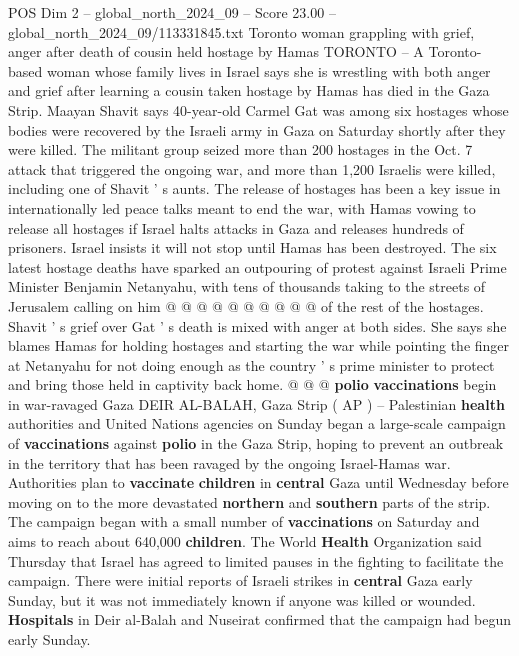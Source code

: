 \begin{textsample}{POS Dim 2 – global\_north\_2024\_09 – Score 23.00 – global\_north\_2024\_09/113331845.txt}  \label{ex:f2_pos_415}
Toronto woman grappling with grief, anger after death of cousin held hostage by Hamas TORONTO -- A Toronto-based woman whose family lives in Israel says she is wrestling with both anger and grief after learning a cousin taken hostage by Hamas has died in the Gaza Strip.
Maayan Shavit says 40-year-old Carmel Gat was among six hostages whose bodies were recovered by the Israeli army in Gaza on Saturday shortly after they were killed.
The militant group seized more than 200 hostages in the Oct. 7 attack that triggered the ongoing war, and more than 1,200 Israelis were killed, including one of Shavit ' s aunts.
The release of hostages has been a key issue in internationally led peace talks meant to end the war, with Hamas vowing to release all hostages if Israel halts attacks in Gaza and releases hundreds of prisoners.
Israel insists it will not stop until Hamas has been destroyed.
The six latest hostage deaths have sparked an outpouring of protest against Israeli Prime Minister Benjamin Netanyahu, with tens of thousands taking to the streets of Jerusalem calling on him @ @ @ @ @ @ @ @ @ @ of the rest of the hostages.
Shavit ' s grief over Gat ' s death is mixed with anger at both sides.
She says she blames Hamas for holding hostages and starting the war while pointing the finger at Netanyahu for not doing enough as the country ' s prime minister to protect and bring those held in captivity back home. @ @ @ \textbf{polio} \textbf{vaccinations} begin in war-ravaged Gaza DEIR AL-BALAH, Gaza Strip ( AP ) -- Palestinian \textbf{health} authorities and United Nations agencies on Sunday began a large-scale campaign of \textbf{vaccinations} against \textbf{polio} in the Gaza Strip, hoping to prevent an outbreak in the territory that has been ravaged by the ongoing Israel-Hamas war.
Authorities plan to \textbf{vaccinate} \textbf{children} in \textbf{central} Gaza until Wednesday before moving on to the more devastated \textbf{northern} and \textbf{southern} parts of the strip.
The campaign began with a small number of \textbf{vaccinations} on Saturday and aims to reach about 640,000 \textbf{children}.
The World \textbf{Health} Organization said Thursday that Israel has agreed to limited pauses in the fighting to facilitate the campaign.
There were initial reports of Israeli strikes in \textbf{central} Gaza early Sunday, but it was not immediately known if anyone was killed or wounded. \textbf{Hospitals} in Deir al-Balah and Nuseirat confirmed that the campaign had begun early Sunday.

\end{textsample}
